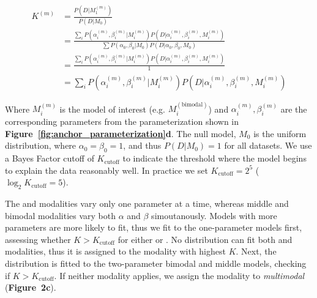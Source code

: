 \begin{align}
K^{(m)}
&= \frac{P(D | M_1^{(m)})}{P(D | M_0)}\\
&=
\frac{\sum_{i} P(\alpha_i^{(m)}, \beta_i^{(m)} | M_i^{(m)}) P(D | \alpha_i^{(m)}, \beta_i^{(m)}, M_i^{(m)})}
{\sum P(\alpha_0, \beta_0 | M_0) P(D | \alpha_0, \beta_0, M_0)}\\
&=
\frac{\sum_{i} P(\alpha_i^{(m)}, \beta_i^{(m)} | M_i^{(m)}) P(D | \alpha_i^{(m)}, \beta_i^{(m)}, M_i^{(m)})}
{1}\\
&=
\sum_{i} P(\alpha_i^{(m)}, \beta_i^{(m)} | M_i^{(m)}) P(D | \alpha_i^{(m)}, \beta_i^{(m)}, M_i^{(m)})
\end{align}

Where $M_i^{(m)}$ is the model of interest (e.g. $M_i^{(\mathrm{bimodal})}$) and $\alpha_i^{(m)}, \beta_i^{(m)}$ are the corresponding parameters from the parameterization shown in \textbf{Figure~\ref{fig:anchor_parameterization}d}. The null model, $M_0$ is the uniform distribution, where $\alpha_0 = \beta_0 = 1$, and thus $P(D|M_0) = 1$ for all datasets. We use a Bayes Factor cutoff of $K_{\mathrm{cutoff}}$ to indicate the threshold where the model begins to explain the data reasonably well. In practice we set $K_{\mathrm{cutoff}} = 2^{5}$ ($\log_2 K_\mathrm{cutoff} = 5$).

The \0 and \1 modalities vary only one parameter at a time, whereas middle and bimodal modalities vary both $\alpha$ and $\beta$ simoutanously. Models with more parameters are more likely to fit, thus we fit to the one-parameter models first, assessing whether $K > K_{\mathrm{cutoff}}$ for either \0 or \1. No distribution can fit both \0 and \1 modalities, thus it is assigned to the modality with highest $K$. Next, the distribution is fitted to the two-parameter bimodal and middle models, checking if $K > K_{\mathrm{cutoff}}$. If neither modality applies, we assign the modality to \emph{multimodal} (\textbf{Figure~2c}).

